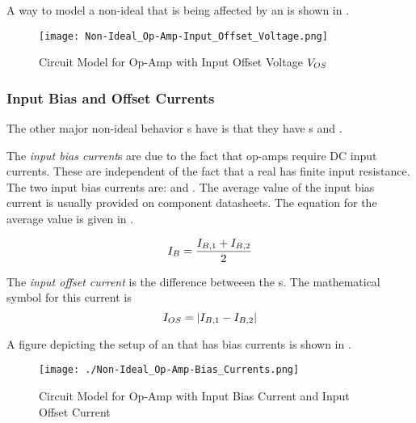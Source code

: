 A way to model a non-ideal  that is being affected by an  is shown in .

\begin{figure}[h!tbp]
  \centering
  \texttt{[image: Non-Ideal\_Op-Amp-Input\_Offset\_Voltage.png]}
  \caption{Circuit Model for Op-Amp with Input Offset Voltage $V_{OS}$ \parencite[p.~97]{sedraTextbook7}}
  \label{fig:Op-Amp_Input_Offset_Voltage}
\end{figure}

\subsubsection{Input Bias and Offset Currents}\label{subsubsec:Input_Bias_Offset_Currents}
The other major non-ideal behavior s have is that they have s and .

\begin{definition}\label{def:Input_Bias_Current}
  The \emph{input bias current}s are due to the fact that op-amps require DC input currents.
  These are independent of the fact that a real  has finite input resistance.
  The two input bias currents are:  and .
  The average value of the input bias current is usually provided on component datasheets.
  The equation for the average value is given in .

  \begin{equation}\label{eq:Average_Input_Bias_Current}
    I_{B} = \frac{I_{B,1} + I_{B,2}}{2}
  \end{equation}
\end{definition}

\begin{definition}\label{def:Input_Offset_Current}
  The \emph{input offset current} is the difference betweeen the s.
  The mathematical symbol for this current is 
  \begin{equation}\label{eq:Input_Offset_Current}
    I_{OS} = \lvert I_{B,1} - I_{B,2} \rvert
  \end{equation}
\end{definition}

A figure depicting the setup of an  that has bias currents is shown in .

\begin{figure}[h!tbp]
  \centering
  \texttt{[image: ./Non-Ideal\_Op-Amp-Bias\_Currents.png]}
  \caption{Circuit Model for Op-Amp with Input Bias Current and Input Offset Current \parencite[p.~101]{sedraTextbook7}}
  \label{fig:Op-Amp_Input_Bias_Offset_Current}
\end{figure}

